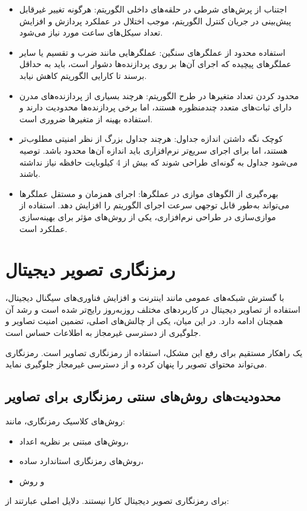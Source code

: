 \begin{itemize}
    \item اجتناب از پرش‌های شرطی در حلقه‌های داخلی الگوریتم: هرگونه تغییر غیرقابل پیش‌بینی در جریان کنترل الگوریتم، موجب اختلال در عملکرد پردازش و افزایش تعداد سیکل‌های ساعت مورد نیاز می‌شود.
    \item استفاده محدود از عملگرهای سنگین: عملگرهایی مانند ضرب و تقسیم یا سایر عملگرهای پیچیده که اجرای آن‌ها بر روی پردازنده‌ها دشوار است، باید به حداقل برسند تا کارایی الگوریتم کاهش نیابد.
    \item محدود کردن تعداد متغیرها در طرح الگوریتم: هرچند بسیاری از پردازنده‌های مدرن دارای ثبات‌های متعدد چندمنظوره هستند، اما برخی پردازنده‌ها محدودیت دارند و استفاده بهینه از متغیرها ضروری است.
    \item کوچک نگه داشتن اندازه جداول: هرچند جداول بزرگ از نظر امنیتی مطلوب‌تر هستند، اما برای اجرای سریع‌تر نرم‌افزاری باید اندازه آن‌ها محدود باشد. توصیه می‌شود جداول به گونه‌ای طراحی شوند که بیش از 4 کیلوبایت حافظه نیاز نداشته باشند.
    \item بهره‌گیری از الگوهای موازی در عملگرها: اجرای همزمان و مستقل عملگرها می‌تواند به‌طور قابل توجهی سرعت اجرای الگوریتم را افزایش دهد. استفاده از موازی‌سازی در طراحی نرم‌افزاری، یکی از روش‌های مؤثر برای بهینه‌سازی عملکرد است.
\end{itemize}

\section{رمزنگاری تصویر دیجیتال}
با گسترش شبکه‌های عمومی مانند اینترنت و افزایش فناوری‌های سیگنال دیجیتال، استفاده از تصاویر دیجیتال در کاربردهای مختلف روزبه‌روز رایج‌تر شده است و رشد آن همچنان ادامه دارد\cite{ref43}. در این میان، یکی از چالش‌های اصلی، تضمین امنیت تصاویر و جلوگیری از دسترسی غیرمجاز به اطلاعات حساس است.

یک راهکار مستقیم برای رفع این مشکل، استفاده از رمزنگاری تصاویر است. رمزنگاری می‌تواند محتوای تصویر را پنهان کرده و از دسترسی غیرمجاز جلوگیری نماید.

\subsection{محدودیت‌های روش‌های سنتی رمزنگاری برای تصاویر}
روش‌های کلاسیک رمزنگاری، مانند:
\begin{itemize}
    \item روش‌های مبتنی بر نظریه اعداد،
    \item روش‌های رمزنگاری استاندارد ساده،
    \item و روش 
\end{itemize}
برای رمزنگاری تصویر دیجیتال کارا نیستند\cite{ref44}. دلایل اصلی عبارتند از:

